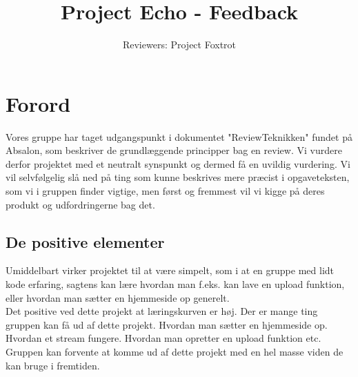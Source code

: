 \documentclass[a4paper]{article}
\title{Project Echo - Feedback}
\author{Reviewers: Project Foxtrot}
\begin{document}
\maketitle
\section{Forord}
Vores gruppe har taget udgangspunkt i dokumentet "ReviewTeknikken" fundet på Absalon, som beskriver de grundlæggende principper bag en review. Vi vurdere derfor projektet med et neutralt synspunkt og dermed få en uvildig vurdering. 
Vi vil selvfølgelig slå ned på ting som kunne beskrives mere præcist i opgaveteksten, som vi i gruppen finder vigtige, men først og fremmest vil vi kigge på deres produkt og udfordringerne bag det.
\subsection{De positive elementer}
Umiddelbart virker projektet til at være simpelt, som i at en gruppe med lidt kode erfaring, sagtens kan lære hvordan man f.eks. kan lave en upload funktion, eller hvordan man sætter en hjemmeside op generelt. \\

Det positive ved dette projekt at læringskurven er høj. Der er mange ting gruppen kan få ud af dette projekt. Hvordan man sætter en hjemmeside op. Hvordan et stream fungere. Hvordan man opretter en upload funktion etc. Gruppen kan forvente at komme ud af dette projekt med en hel masse viden de kan bruge i fremtiden.
\end{document}
